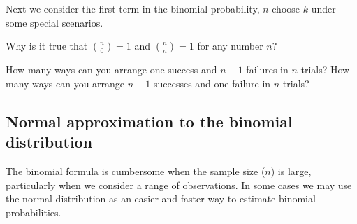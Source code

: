 Next we consider the first term in the binomial probability, $n$ choose $k$ under some special scenarios.

\begin{exercisewrap}
\begin{nexercise}
Why is it true that ${n \choose 0}=1$ and ${n \choose n}=1$ for any number $n$?\footnotemark
\end{nexercise}
\end{exercisewrap}

\begin{exercisewrap}
\begin{nexercise}
How many ways can you arrange one success and $n-1$ failures in $n$ trials? How many ways can you arrange $n-1$ successes and one failure in $n$ trials?\footnotemark
\end{nexercise}
\end{exercisewrap}



\subsection{Normal approximation to the binomial distribution}
\label{normalApproxBinomialDistSubsection}


The binomial formula is cumbersome when the sample size ($n$) is large, particularly when we consider a range of observations. In some cases we may use the normal distribution as an easier and faster way to estimate binomial probabilities.

